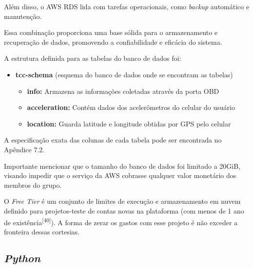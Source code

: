      Além disso, o AWS RDS lida com tarefas operacionais, como \textit{backup} automático e manutenção. 
     
     Essa combinação proporciona uma base sólida para o armazenamento e recuperação de dados, promovendo a confiabilidade e eficácia do sistema.

     A estrutura definida para as tabelas do banco de dados foi:


    \begin{itemize}
         \item{\textbf{tcc-schema} (esquema do banco de dados onde se encontram as tabelas)}
         
        \begin{itemize}
             \item{\textbf{info:} Armazena as informações coletadas através da porta OBD} 
        
             \item{\textbf{acceleration:} Contém dados dos acelerômetros do celular do usuário} 
             
             \item{\textbf{location:} Guarda latitude e longitude obtidas por GPS pelo celular}   
        \end{itemize}  
    \end{itemize}

     A especificação exata das colunas de cada tabela pode ser encontrada no Apêndice 7.2.

        
        
        

    Importante mencionar que o tamanho do banco de dados foi limitado a 20GiB, visando impedir que o serviço da AWS cobrasse qualquer valor monetário dos membros do grupo.
    
    O \textit{Free Tier} é um conjunto de limites de execução e armazenamento em nuvem definido para projetos-teste de contas novas na plataforma (com menos de 1 ano de existência\textsuperscript{[40]}). A forma de zerar os gastos com esse projeto é não exceder a fronteira dessas cortesias.

    
    \subsection{\textit{Python}} 

